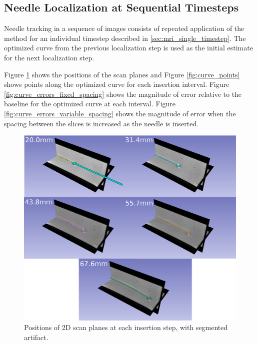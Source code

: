 
\subsection{Needle Localization at Sequential Timesteps}
Needle tracking in a sequence of images consists of repeated application of the method for an individual timestep described in \ref{sec:mri_single_timestep}. The optimized curve from the previous localization step is used as the initial estimate for the next localization step.

Figure \ref{fig:scan_slices} shows the positions of the scan planes and Figure \ref{fig:curve_points} shows points along the optimized curve for each insertion interval. Figure \ref{fig:curve_errors_fixed_spacing} shows the magnitude of error relative to the baseline for the optimized curve at each interval. Figure \ref{fig:curve_errors_variable_spacing} shows the magnitude of error when the spacing between the slices is increased as the needle is inserted.

\begin{figure}[h]
\includegraphics[width=1.0\textwidth]{Fig/chap5/scan_slices_labels.png}
\caption{Positions of 2D scan planes at each insertion step, with segmented artifact.}
\label{fig:scan_slices}
\end{figure}

